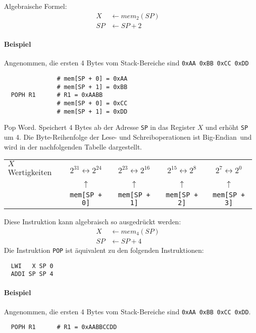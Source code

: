 Algebraische Formel:
\begin{align*}
  X  & \gets mem_{2}(SP) \\
  SP & \gets SP + 2
\end{align*}

\paragraph{Beispiel}
Angenommen, die ersten 4 Bytes vom Stack-Bereiche sind \texttt{0xAA 0xBB 0xCC 0xDD}
\begin{lstlisting}
               # mem[SP + 0] = 0xAA
               # mem[SP + 1] = 0xBB
  POPH R1      # R1 = 0xAABB
               # mem[SP + 0] = 0xCC
               # mem[SP + 1] = 0xDD
\end{lstlisting}




\glqq Pop Word\grqq.
Speichert 4 Bytes ab der Adresse \texttt{SP} in das Register $X$ und erhöht
\texttt{SP} um 4.
Die Byte-Reihenfolge der Lese- und Schreiboperationen ist \glqq Big-Endian\grqq\
und wird in der nachfolgenden Tabelle dargestellt.

\begin{center}
\begin{tabular}{l|cccc}
  \toprule
  $X$  Wertigkeiten &
  $2^{31} \leftrightarrow 2^{24}$ &
  $2^{23} \leftrightarrow 2^{16}$ &
  $2^{15} \leftrightarrow 2^{8}$  &
  $2^{7}  \leftrightarrow 2^{0}$ 
  \\
  &
  $\uparrow$ & $\uparrow$ & $\uparrow$ & $\uparrow$ 
  \\
  \text{Stack-Bereich} &
  \texttt{mem[SP + 0]} &
  \texttt{mem[SP + 1]} &
  \texttt{mem[SP + 2]} &
  \texttt{mem[SP + 3]}
  \\\bottomrule
\end{tabular}
\end{center}

Diese Instruktion kann algebraisch so ausgedrückt werden:
\begin{align*}
  X  & \gets mem_{4}(SP) \\
  SP & \gets SP + 4
\end{align*}
Die Instruktion \texttt{POP} ist äquivalent zu den folgenden Instruktionen:
\begin{lstlisting}
  LWI   X SP 0
  ADDI SP SP 4
\end{lstlisting}


\paragraph{Beispiel}
Angenommen, die ersten 4 Bytes vom Stack-Bereiche sind
\texttt{0xAA 0xBB 0xCC 0xDD}.
\begin{lstlisting}
  POPH R1      # R1 = 0xAABBCCDD
\end{lstlisting}

